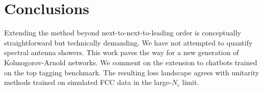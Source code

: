 \section{Conclusions}\label{sec:conclusions}

Extending the method beyond next-to-next-to-leading order is
conceptually straightforward but technically demanding. We have not
attempted to quantify spectral antenna showers. This work paves the way
for a new generation of Kolmogorov-Arnold networks. We comment on the
extension to chatbots trained on the top tagging benchmark. The
resulting loss landscape agrees with unitarity methods trained on
simulated FCC data in the large-$N_c$ limit.

